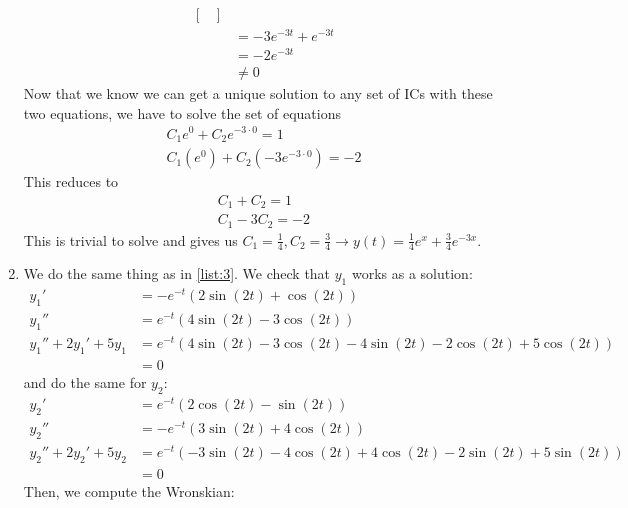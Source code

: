 \documentclass[12pt]{article}
\begin{document}
\begin{enumerate}
\begin{align*}
\begin{bmatrix}
                                   \end{bmatrix} \\
                          & = -3e^{-3t}+e^{-3t}        \\
                          & = -2e^{-3t}                \\
                          & \ne 0
          \end{align*}
          Now that we know we can get a unique solution to any set of ICs with these two equations, we have to solve the set of equations
          \begin{gather*}
              C_1 e^{0} +C_2 e^{-3 \cdot 0} = 1 \\
              C_1(e^{0})+C_2(-3e^{-3 \cdot 0}) = -2
          \end{gather*}
          This reduces to
          \begin{gather*}
              C_1+C_2=1 \\
              C_1-3C_2=-2
          \end{gather*}
          This is trivial to solve and gives us $C_1=\frac{1}{4},C_2=\frac{3}{4} \rightarrow \boxed{y(t)=\frac{1}{4}e^x+\frac{3}{4}e^{-3x}}$. \label{list:3}
    \item We do the same thing as in \ref{list:3}.
          We check that $y_1$ works as a solution:
          \begin{align*}
              y_1'             & =-e^{-t} (2\sin (2t) + \cos (2t))                              \\
              y_1''            & =e^{-t} (4\sin (2t) - 3\cos (2t))                              \\
              y_1''+2y_1'+5y_1 & =e^{-t}(4\sin(2t)-3\cos(2t)-4 \sin (2t)-2 \cos(2t)+5 \cos(2t)) \\
                               & = 0
          \end{align*}
          and do the same for $y_2$:
          \begin{align*}
              y_2'             & =e^{-t}(2 \cos (2t)-\sin (2t))                                     \\
              y_2''            & =-e^{-t}(3 \sin (2t)+4\cos (2t))                                   \\
              y_2''+2y_2'+5y_2 & = e^{-t}(-3 \sin (2t)- 4\cos(2t)+4 \cos(2t)-2 \sin(2t)+5 \sin(2t)) \\
                               & = 0
          \end{align*}
          Then, we compute the Wronskian:

\end{enumerate}
\end{document}
